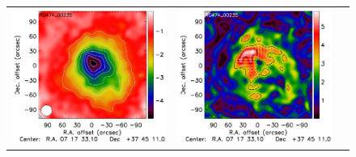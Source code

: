 \documentclass[traditabstract]{aa}
\begin{document}
\begin{figure}[h]
{\begin{tabular}{lll}
\includegraphics[trim=0cm 0.7cm 0cm 0cm, clip=true, scale=1]{Figure/Map_RG474_00235_Ymap_zobs0p4_processed.pdf} & 
\includegraphics[trim=2.3cm 0.7cm 0cm 0cm, clip=true, scale=1]{Figure/Grad_RG474_00235_Ymap_zobs0p4_processed_15_15_45.pdf} & 

\end{tabular}}
\end{figure}
\end{document}
